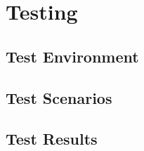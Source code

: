 \chapter{Testing}


\section{Test Environment}


\section{Test Scenarios}



\section{Test Results}


